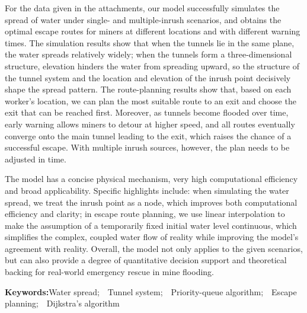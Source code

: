 \documentclass[12pt,a4paper]{article}
\makeatletter
\renewcommand{\section}{\@startsection{section}{1}{\z@}{2.5ex \@plus 1ex}{1.5ex}{\centering\Large\bfseries}}
\makeatother
\begin{document}
For the data given in the attachments, our model successfully simulates the spread of water under single- and multiple-inrush scenarios, and obtains the optimal escape routes for miners at different locations and with different warning times. The simulation results show that when the tunnels lie in the same plane, the water spreads relatively widely; when the tunnels form a three-dimensional structure, elevation hinders the water from spreading upward, so the structure of the tunnel system and the location and elevation of the inrush point decisively shape the spread pattern. The route-planning results show that, based on each worker's location, we can plan the most suitable route to an exit and choose the exit that can be reached first. Moreover, as tunnels become flooded over time, early warning allows miners to detour at higher speed, and all routes eventually converge onto the main tunnel leading to the exit, which raises the chance of a successful escape. With multiple inrush sources, however, the plan needs to be adjusted in time.

The model has a concise physical mechanism, very high computational efficiency and broad applicability. Specific highlights include: when simulating the water spread, we treat the inrush point as a node, which improves both computational efficiency and clarity; in escape route planning, we use linear interpolation to make the assumption of a temporarily fixed initial water level continuous, which simplifies the complex, coupled water flow of reality while improving the model's agreement with reality. Overall, the model not only applies to the given scenarios, but can also provide a degree of quantitative decision support and theoretical backing for real-world emergency rescue in mine flooding.

\vspace{1em}
{\raggedright\noindent\textbf{\sffamily Keywords:}\quad Water spread;\ \ Tunnel system;\ \ Priority-queue algorithm;\ \ Escape planning;\ \ Dijkstra's algorithm\par}
\endgroup

\newpage
\renewcommand{\contentsname}{\centerline{Contents}}
\tableofcontents
\newpage

\section{Introduction}
\end{document}
